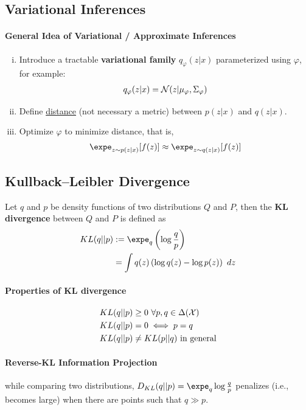 \documentclass{article}
\begin{document}
	\subsection{Variational Inferences}
	\paragraph{General Idea of Variational / Approximate Inferences}
	\begin{enumerate}[(i)]
		\item Introduce a tractable \textbf{variational family} $q_\varphi (z | x)$ parameterized using $\varphi$, for example:
		\begin{align}
			q_\varphi (z | x) = \mathcal{{N}}(z | \mu_\varphi, \Sigma_\varphi)
		\end{align}
		\item Define \ul{distance} (not necessary a metric) between $p(z|x)$ and $q(z|x)$.
		\item Optimize $\varphi$ to minimize distance, that is,
		\begin{align}
			\expe_{z \sim p(z|x)}[f(z)] \approx \expe_{z \sim q(z|x)}[f(z)]
		\end{align}
	\end{enumerate}
	
	\subsection{Kullback–Leibler Divergence}
	\begin{definition}
		Let $q$ and $p$ be density functions of two distributions $Q$ and $P$, then the \textbf{KL divergence} between $Q$ and $P$ is defined as
		\begin{align}
			KL(q || p) &:= \expe_{q} \left(\log{\frac{q}{p}} \right) \\
			&= \int q(z) \left( \log q(z) - \log p(z) \right)\ dz
		\end{align}
	\end{definition}
	\paragraph{Properties of KL divergence}
	\begin{align}
		KL(q || p) &\geq 0\ \forall p, q \in \Delta(\mathcal{{X}}) \\
		KL(q || p) &= 0 \iff p = q \\
		KL(q || p) &\neq KL(p || q) \text{{ in general}}
	\end{align}
	\paragraph{Reverse-KL Information Projection} while comparing two distributions, $D_{KL}(q||p) = \expe_q \log \frac{q}{p}$ penalizes (i.e., becomes large) when there are points such that $q \gg p$.
	
\end{document}
